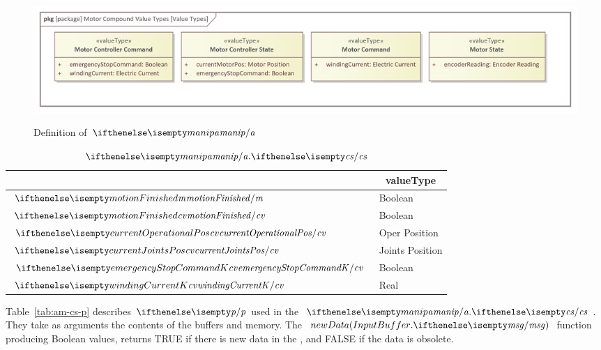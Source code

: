 \documentclass[11pt,oneside,a4paper]{article}
\newcommand{\Table}[0]{Table}
\begin{document}
	\begin{figure}[H]
		\centering
		\begin{center}
			{\includegraphics[width=\columnwidth]{img/value_types/motor_compound_value_types.png}}
		\end{center}
		\caption{Definition of $\protect\ea{manip}$ \ValueTypes{}}
		\label{fig:a_manip_messages}
	\end{figure}
	
	
	
	\begin{table}[H]
		\centering
		\caption{$\protect\ea{manip}.\protect\ecs{}$ \ValueTypes{}}
		\begin{tabular}[]{p{5.0cm} p{2.5cm}}
			\toprule
			\multicolumn{1}{c}{}	& \multicolumn{1}{c}{\textbf{valueType}{}} \\ 
			\midrule
			$\emb{motionFinished}$ & Boolean\\ 
			$\ecv{motionFinished}$ & Boolean\\ 
			$\ecv{currentOperationalPos}$ & Oper Position\\ 
			$\ecv{currentJointsPos}$ & Joints Position\\ 
			$\ecv{emergencyStopCommandK}$ & Boolean\\ 
			$\ecv{windingCurrentK}$ & Real\\ 
			\bottomrule
		\end{tabular}
		\label{tab:am-cs-mb}
	\end{table}	
	
	\Table{}~\ref{tab:am-cs-p} describes \Predicates{} $\ep{}$ used in the \ControlSubsystem{} $\ea{manip}.\ecs{}$. They take as arguments the contents of the buffers and memory.
	The~$newData(\InputBuffer{}.\emsg{})$ function producing Boolean values, returns TRUE if there is new data in the \InputBuffer{}, and FALSE if the data is obsolete.
	
\end{document}
